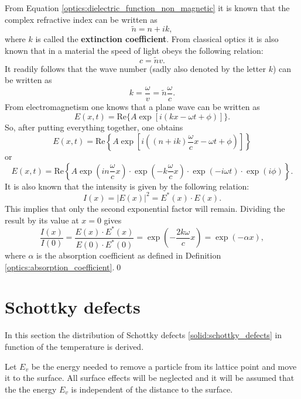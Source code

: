     From Equation \eqref{optics:dielectric_function_non_magnetic} it is known that the complex refractive index can be written as \[\widetilde{n} = n+ik,\] where $k$ is called the \textbf{extinction coefficient}. From classical optics it is also known that in a material the speed of light obeys the following relation: \[c = \widetilde{n}v.\] It readily follows that the wave number (sadly also denoted by the letter $k$) can be written as \[k = \frac{\omega}{v} = \widetilde{n}\frac{\omega}{c}.\] From electromagnetism one knows that a plane wave can be written as \[E(x,t) = \mathrm{Re}\big\{A\exp\left[i(kx - \omega t + \phi)\right]\big\}.\] So, after putting everything together, one obtains \[E(x,t) = \mathrm{Re}\left\{A\exp\left[i\left((n+ik)\frac{\omega}{c}x - \omega t + \phi\right)\right]\right\}\] or \[E(x,t) = \mathrm{Re}\left\{A\exp\left(in\frac{\omega}{c}x\right)\cdot\exp\left(-k\frac{\omega}{c}x\right)\cdot\exp\left(-i\omega t\right)\cdot\exp\left(i\phi\right)\right\}.\] It is also known that the intensity is given by the following relation:\[I(x) = |E(x)|^2 = E^*(x)\cdot E(x).\] This implies that only the second exponential factor will remain. Dividing the result by its value at $x=0$ gives \[\frac{I(x)}{I(0)} = \frac{E(x)\cdot E^*(x)}{E(0)\cdot E^*(0)} = \exp\left(-\frac{2k\omega}{c}x\right) = \exp(-\alpha x),\]
    where $\alpha$ is the absorption coefficient as defined in Definition \ref{optics:absorption_coefficient}.\qed

\section{Schottky defects}\label{deriv:schottky_defects}

    In this section the distribution of Schottky defects \ref{solid:schottky_defects} in function of the temperature is derived.

    Let $E_v$ be the energy needed to remove a particle from its lattice point and move it to the surface. All surface effects will be neglected and it will be assumed that the the energy $E_v$ is independent of the distance to the surface.

